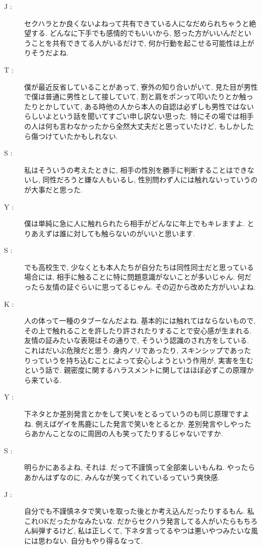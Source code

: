 \documentclass[10pt,b5jsbook,dvips,dvipdfmx,openany]{jsbook}
\theoremstyle{definition}
\begin{document}
\begin{multicols}{2}
\begin{description}
		\item[ J : ] セクハラとか良くないよねって共有できている人になだめられちゃうと絶望する. どんなに下手でも感情的でもいいから, 怒った方がいいんだということを共有できてる人がいるだけで, 何か行動を起こせる可能性は上がりそうだよね. 

		\item[ T : ] 僕が最近反省していることがあって, 寮外の知り合いがいて, 見た目が男性で僕は普通に男性として接していて, 割と肩をポンって叩いたりとか触ったりとかしていて, ある時他の人から本人の自認は必ずしも男性ではないらしいよという話を聞いてすごい申し訳ない思った. 特にその場では相手の人は何も言わなかったから全然大丈夫だと思っていたけど, もしかしたら傷つけていたかもしれない. 

		\item[ S : ] 私はそういうの考えたときに, 相手の性別を勝手に判断することはできないし, 同性だろうと嫌な人もいるし, 性別問わず人には触れないっていうのが大事だと思った. 

		\item[ Y : ] 僕は単純に急に人に触れられたら相手がどんなに年上でもキレますよ. とりあえずは誰に対しても触らないのがいいと思います. 

		\item[ S : ] でも高校生で, 少なくとも本人たちが自分たちは同性同士だと思っている場合には, 相手に触ることに特に問題意識がないことが多いじゃん.  何だったら友情の証ぐらいに思ってるじゃん.  その辺から改めた方がいいよね. 

		\item[ K : ] 人の体って一種のタブーなんだよね. 基本的には触れてはならないもので, その上で触れることを許したり許されたりすることで安心感が生まれる. 友情の証みたいな表現はその通りで, そういう認識のされ方をしている. これはだいぶ危険だと思う. 身内ノリであったり, スキンシップであったりっていうを持ち込むことによって安心しようという作用が, 実害を生むという話で. 親密度に関するハラスメントに関してはほぼ必ずこの原理から来ている. 

		\item[ Y : ] 下ネタとか差別発言とかをして笑いをとるっていうのも同じ原理ですよね. 例えばゲイを馬鹿にした発言で笑いをとるとか. 差別発言やしやったらあかんことなのに周囲の人も笑ってたりするじゃないですか. 

		\item[ S : ] 明らかにあるよね, それは. だって不謹慎って全部楽しいもんね. やったらあかんはずなのに, みんなが笑ってくれているっていう爽快感. 

		\item[ J : ] 自分でも不謹慎ネタで笑いを取った後とか考え込んだったりするもん. 私これOKだったかなみたいな. だからセクハラ発言してる人がいたらもちろん糾弾するけど, 私は正しくて, 下ネタ言ってるやつは悪いやつみたいな風には思わない. 自分もやり得るなって. 


\end{description}
\end{multicols}
\end{document}
